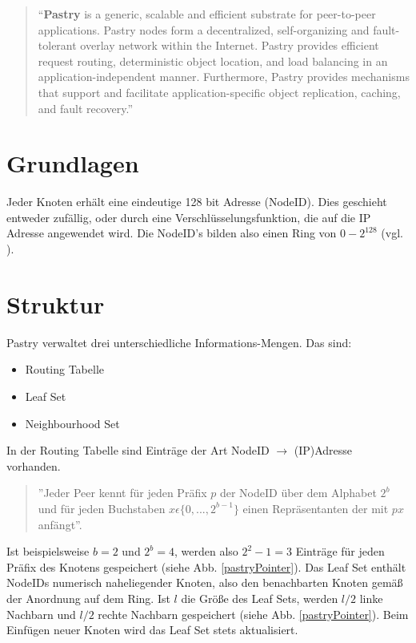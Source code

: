 \begin{quote}
"`\textbf{Pastry} is a generic, scalable and efficient substrate for peer-to-peer 
applications. Pastry nodes form a decentralized, self-organizing and 
fault-tolerant overlay network within the Internet. Pastry provides efficient 
request routing, deterministic object location, and load balancing in an 
application-independent manner. Furthermore, Pastry provides mechanisms that 
support and facilitate application-specific object replication, caching, and 
fault recovery."'
\end{quote}

\section{Grundlagen}
Jeder Knoten erhält eine eindeutige 128 bit Adresse (NodeID).
Dies geschieht entweder zufällig, oder durch eine Verschlüsselungsfunktion, die
auf die IP Adresse angewendet wird. Die NodeID's bilden also einen Ring von
$0-2^{128}$ (vgl. \cite{Schindelhauer2004}).

\section{Struktur}
\label{struktur}
Pastry verwaltet drei unterschiedliche Informations-Mengen. Das
sind: 
\begin{itemize}
  \item Routing Tabelle
  \item Leaf Set
  \item Neighbourhood Set
\end{itemize}
In der Routing Tabelle sind Einträge der Art NodeID $\rightarrow$ (IP)Adresse
vorhanden. 
\begin{quote}
''Jeder Peer kennt für jeden Präfix $p$ der NodeID über dem Alphabet
$2^b$ und für jeden Buchstaben $x \epsilon \{0, . . . , 2^{b - 1}\}$ einen
Repräsentanten der mit $px$ anfängt''\cite{Schindelhauer2004}. 
\end{quote}  
Ist beispielsweise $b=2$ und $2^b=4$, werden also $2^{2}-1 = 3$ Einträge für
jeden Präfix des Knotens gespeichert (siehe Abb. \ref{pastryPointer}).
\newline Das Leaf
Set enthält NodeIDs numerisch naheliegender Knoten, also
den benachbarten Knoten gemäß der Anordnung auf dem Ring. Ist $l$ die Größe des
Leaf Sets, werden $l/2$ linke Nachbarn und $l/2$ rechte Nachbarn gespeichert
\cite{Schindelhauer2004}(siehe Abb. \ref{pastryPointer}). Beim
Einfügen neuer Knoten wird das Leaf Set stets aktualisiert. 

